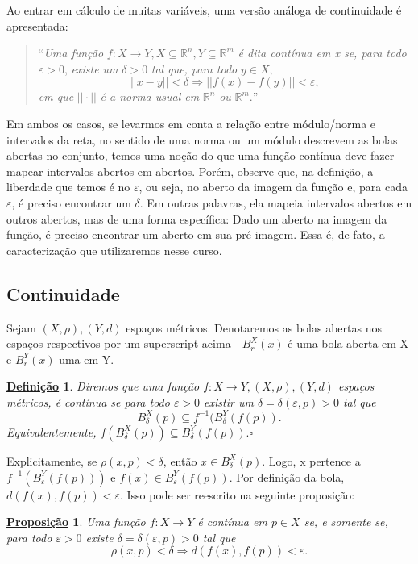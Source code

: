 \documentclass{article}
\newtheorem*{def*}{\underline{Defini\c c\~ao}}
\newtheorem*{prop*}{\underline{Proposi\c c\~ao}}
\begin{document}
  Ao entrar em cálculo de muitas variáveis, uma versão análoga de continuidade é apresentada:

\begin{quote}
  ``\textit{Uma função} \(f:X\rightarrow Y, X\subseteq{\mathbb{R}^{n}}, Y\subseteq{\mathbb{R}^{m}}\) \textit{é dita contínua em x se, para todo} \(\varepsilon >0\), \textit{existe um }\(\delta >0\)
\textit{tal que, para todo} \(y\in X\), 
  \[
    ||x-y|| < \delta \Rightarrow ||f(x)-f(y)|| < \varepsilon, 
  \]
  \textit{em que} \(||\cdot ||\) \textit{é a norma usual em} \(\mathbb{R}^{n}\) \textit{ou }\(\mathbb{R}^{m}.\)''
\end{quote}
  Em ambos os casos, se levarmos em conta a relação entre módulo/norma e intervalos da reta, no sentido de uma norma ou um módulo descrevem as bolas abertas no conjunto, temos uma noção
do que uma função contínua deve fazer - mapear intervalos abertos em abertos. Porém, observe que, na definição, a liberdade que temos é no \(\varepsilon \), ou seja, no aberto da imagem da função
e, para cada \(\varepsilon \), é preciso encontrar um \(\delta \). Em outras palavras, ela mapeia intervalos abertos em outros abertos, mas de uma forma específica: Dado um aberto na imagem da função,
é preciso encontrar um aberto em sua pré-imagem. Essa é, de fato, a caracterização que utilizaremos nesse curso. 
\subsection{Continuidade}
 Sejam \((X, \rho ), (Y, d)\) espaços métricos. Denotaremos as bolas abertas nos espaços respectivos por um superscript acima - \(B^{X}_{r}(x)\) é uma bola aberta
em X e \(B_{r}^{Y}(x)\) uma em Y.
\begin{def*}
  Diremos que uma função \(f:X\rightarrow Y, (X, \rho ), (Y, d)\) espaços métricos, é contínua se para todo \(\varepsilon >0\) existir um \(\delta = \delta (\varepsilon, p) > 0\) tal que 
    \[
      B_{\delta }^{X}(p)\subseteq{f^{-1}(B_{\delta }^{Y}(f(p))}.
    \]
    Equivalentemente, \(f(B_{\delta }^{X}(p))\subseteq{B_{\delta }^{Y}(f(p))}.\square\)
\end{def*}
  Explicitamente, se \(\rho (x, p) < \delta \), então \(x\in B_{\delta }^{X}(p).\) Logo, x pertence a \(f^{-1}(B_{\varepsilon }^{Y}(f(p)))\) e
 \(f(x)\in B_{\varepsilon }^{Y}(f(p)).\) Por definição da bola, \(d(f(x), f(p)) < \varepsilon.\) Isso pode ser reescrito na seguinte proposição:
\begin{prop*}
  Uma função \(f:X\rightarrow Y\) é contínua em \(p\in X\) se, e somente se, para todo \(\varepsilon >0\) existe
 \(\delta = \delta (\varepsilon , p) > 0\) tal que 
   \[
     \rho (x, p)<\delta  \Rightarrow d(f(x), f(p)) <\varepsilon .
   \]
\end{prop*}
\end{document}
